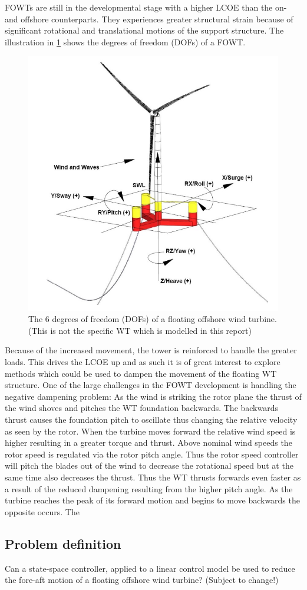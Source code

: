 FOWTs are still in the developmental stage with a higher LCOE than the on- and offshore counterparts. They experiences greater structural strain because of significant rotational and translational motions of the support structure. The illustration in \cref{fig:fowt_coordinates} shows the degrees of freedom (DOFs) of a FOWT. 
\begin{figure}[h]
	\centering
	\includegraphics[width=0.55\linewidth]{Graphics/FOWTcoordinates.png}
	\caption{The 6 degrees of freedom (DOFs) of a floating offshore wind turbine. (This is not the specific WT which is modelled in this report) \cite{Vanelli2021}}
	\label{fig:fowt_coordinates}
\end{figure}
Because of the increased movement, the tower is reinforced to handle the greater loads. This drives the LCOE up and as such it is of great interest to explore methods which could be used to dampen the movement of the floating WT structure. One of the large challenges in the FOWT development is handling the negative dampening problem: As the wind is striking the rotor plane the thrust of the wind shoves and pitches the WT foundation backwards. The backwards thrust causes the foundation pitch to oscillate thus changing the relative velocity as seen by the rotor. When the turbine moves forward the relative wind speed is higher resulting in a greater torque and thrust. Above nominal wind speeds the rotor speed is regulated via the rotor pitch angle. Thus the rotor speed controller will pitch the blades out of the wind to decrease the rotational speed but at the same time also decreases the thrust. Thus the WT thrusts forwards even faster as a result of the reduced dampening resulting from the higher pitch angle. As the turbine reaches the peak of its forward motion and begins to move backwards the opposite occurs. The 



\subsection{Problem definition}
Can a state-space controller, applied to a linear control model be used to reduce the fore-aft motion of a floating offshore wind turbine? (Subject to change!)


